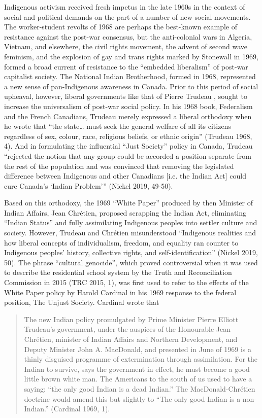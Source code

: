 \documentclass[12pt,oneside]{memoir}
\begin{document}
Indigenous activism received fresh impetus in the late 1960s in the context of social and political demands on the part of a number of new social movements. The worker-student revolts of 1968 are perhaps the best-known example of resistance against the post-war consensus, but the anti-colonial wars in Algeria, Vietnam, and elsewhere, the civil rights movement, the advent of second wave feminism, and the explosion of gay and trans rights marked by Stonewall in 1969, formed a broad current of resistance to the ``embedded liberalism'' of post-war capitalist society. The National Indian Brotherhood, formed in 1968, represented a new sense of pan-Indigenous awareness in Canada. Prior to this period of social upheaval, however, liberal governments like that of Pierre Trudeau , sought to increase the universalism of post-war social policy. In his 1968 book, Federalism and the French Canadians, Trudeau merely expressed a liberal orthodoxy when he wrote that ``the state{\ldots} must seek the general welfare of all its citizens regardless of sex, colour, race, religious beliefs, or ethnic origin'' (Trudeau 1968, 4). And in formulating the influential ``Just Society'' policy in Canada, Trudeau ``rejected the notion that any group could be accorded a position separate from the rest of the population and was convinced that removing the legislated difference between Indigenous and other Canadians [i.e. the Indian Act] could cure Canada's `Indian Problem''' (Nickel 2019, 49-50). 

Based on this orthodoxy, the 1969 ``White Paper'' produced by then Minister of Indian Affairs, Jean Chrétien, proposed scrapping the Indian Act, eliminating ``Indian Status'' and fully assimilating Indigenous peoples into settler culture and society. However, Trudeau and Chrétien misunderstood ``Indigenous realities and how liberal concepts of individualism, freedom, and equality ran counter to Indigenous peoples' history, collective rights, and self-identification'' (Nickel 2019, 50). The phrase ``cultural genocide'', which proved controversial when it was used to describe the residential school system by the Truth and Reconciliation Commission in 2015 (TRC 2015, 1), was first used to refer to the effects of the White Paper policy by Harold Cardinal in his 1969 response to the federal position, The Unjust Society. Cardinal wrote that

\begin{quote}
The new Indian policy promulgated by Prime Minister Pierre Elliott Trudeau's government, under the auspices of the Honourable Jean Chrétien, minister of Indian Affairs and Northern Development, and Deputy Minister John A. MacDonald, and presented in June of 1969 is a thinly disguised programme of extermination through assimilation. For the Indian to survive, says the government in effect, he must become a good little brown white man. The Americans to the south of us used to have a saying: ``the only good Indian is a dead Indian.'' The MacDonald-Chrétien doctrine would amend this but slightly to ``The only good Indian is a non-Indian.'' (Cardinal 1969, 1).
\end{quote}
\end{document}
